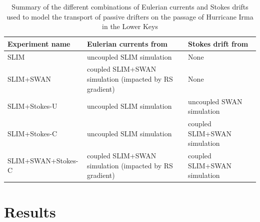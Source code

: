 \begin{table}
    \centering
    \begin{tabular}{|p{4.5cm}|p{4cm}|p{4cm}|}
        \hline
        \textbf{Experiment name} & \textbf{Eulerian currents from} &  \textbf{Stokes drift from}\\ \hline
        SLIM               & uncoupled SLIM simulation & None \\ \hline
        SLIM+SWAN          & coupled SLIM+SWAN simulation (impacted by RS gradient) & None \\ \hline
        SLIM+Stokes-U      & uncoupled SLIM simulation & uncoupled SWAN simulation \\ \hline
        SLIM+Stokes-C      & uncoupled SLIM simulation & coupled SLIM+SWAN simulation \\ \hline
        SLIM+SWAN+Stokes-C & coupled SLIM+SWAN simulation (impacted by RS gradient) & coupled SLIM+SWAN simulation \\ \hline
    \end{tabular}
    \caption{Summary of the different combinations of Eulerian currents and Stokes drifts used to model the transport of passive drifters on the passage of Hurricane Irma in the Lower Keys}
    \label{tab:summary}
\end{table}

\section{Results}


